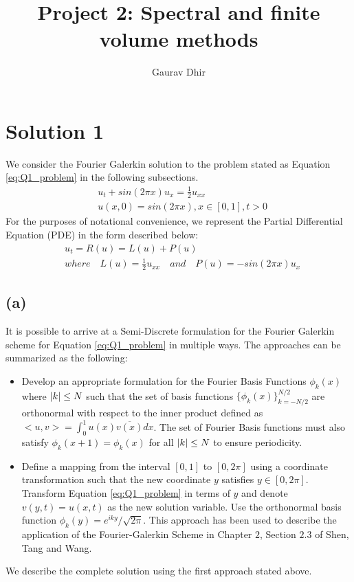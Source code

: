 \documentclass[12pt]{article}
\DeclarePairedDelimiter\abs{\lvert}{\rvert}
\begin{document}
\title{Project 2: Spectral and finite volume methods}
\author{Gaurav Dhir}
\maketitle
\section{Solution 1}
We consider the Fourier Galerkin solution to the problem stated as Equation \ref{eq:Q1_problem} in the following subsections.
\begin{equation}
\begin{aligned}
& u_t + sin(2 \pi x)u_x = \frac{1}{2}u_{xx} \\
& u(x, 0) = sin( 2 \pi x ), x \in [0, 1], t > 0
\end{aligned}
\label{eq:Q1_problem}
\end{equation}
For the purposes of notational convenience, we represent the Partial Differential Equation (PDE) in the form described below:
\begin{equation}
    \begin{aligned}
        & u_t = R(u) = L(u) + P(u) \\
        & where \quad L(u) = \frac{1}{2}u_{xx} \quad and \quad P(u) = -sin(2 \pi x)u_x
    \end{aligned}
\label{eq:simplified}
\end{equation}
\subsection{(a)}
It is possible to arrive at a Semi-Discrete formulation for the Fourier Galerkin scheme for Equation \ref{eq:Q1_problem} in multiple ways.  The approaches can be summarized as the following:
\begin{itemize}
    \item Develop an appropriate formulation for the Fourier Basis Functions $\phi_k(x)$ where $\abs{k} \leq N$ such that the set of basis functions $\{ \phi_k(x) \}_{k = -N/2}^{N/2}$ are orthonormal with respect to the inner product defined as $<u, v> = \int_0^1 u(x) \overline{v(x)} dx$. The set of Fourier Basis functions must also satisfy $\phi_k(x + 1) = \phi_k(x)$ for all $\abs{k} \leq N$ to ensure periodicity.
    \item Define a mapping from the interval $[0, 1]$ to $[0, 2 \pi]$ using a coordinate transformation such that the new coordinate $y$ satisfies $y \in [0, 2 \pi]$. Transform Equation \ref{eq:Q1_problem} in terms of $y$ and denote $v(y, t) = u(x, t)$ as the new solution variable. Use the orthonormal basis function $\phi_k(y) = e^{i k y}/\sqrt{2 \pi}$. This approach has been used to describe the application of the Fourier-Galerkin Scheme in Chapter $2$, Section $2.3$ of Shen, Tang and Wang. 
\end{itemize}
We describe the complete solution using the first approach stated above.
\end{document}
